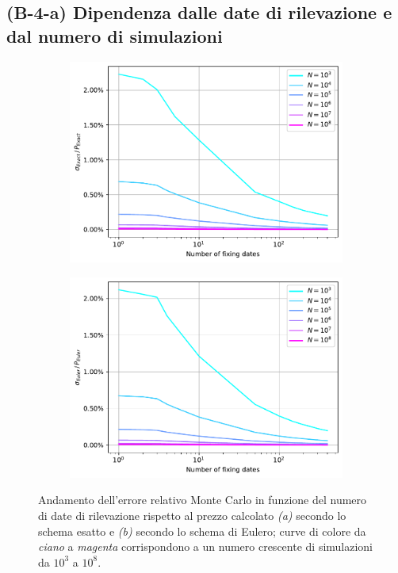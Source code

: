 \subsection{(B-4-a) Dipendenza dalle date di rilevazione e dal numero di simulazioni}

\begin{figure}[t]
\centering
\begin{subfigure}{.5\textwidth}
  \centering
  \includegraphics[scale=0.5]{graphs/OptionPriceVsM_ExactErrorVsM_WithDifferentNs.pdf}
  \caption{}
  \label{fig:exact_error_M}
\end{subfigure}%
\begin{subfigure}{.5\textwidth}
  \centering
  \includegraphics[scale=0.5]{graphs/OptionPriceVsM_EulerErrorVsM_WithDifferentNs.pdf}
  \caption{}
  \label{fig:euler_error_M}
\end{subfigure}
\caption{Andamento dell'errore relativo Monte Carlo in funzione del numero di date di rilevazione rispetto al prezzo calcolato \textit{(a)} secondo lo schema esatto e \textit{(b)} secondo lo schema di Eulero; curve di colore da \textit{ciano} a \textit{magenta} corrispondono a un numero crescente di simulazioni da ${10}^3$ a ${10}^8$.}
\end{figure}

